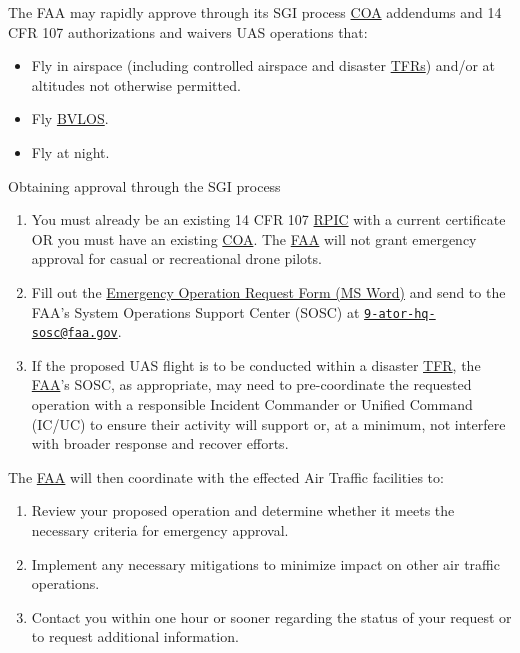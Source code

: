 \documentclass[
]{book}
\providecommand{\tightlist}{%
  \setlength{\itemsep}{0pt}\setlength{\parskip}{0pt}}
\begin{document}
The FAA may rapidly approve through its SGI process \protect\hyperlink{COA}{COA} addendums and 14 CFR 107 authorizations and waivers UAS operations that:

\begin{itemize}
\tightlist
\item
  Fly in airspace (including controlled airspace and disaster \protect\hyperlink{TFR}{TFRs}) and/or at altitudes not otherwise permitted.
\item
  Fly \protect\hyperlink{BVLOS}{BVLOS}.
\item
  Fly at night.
\end{itemize}

Obtaining approval through the SGI process

\begin{enumerate}
\def\labelenumi{\arabic{enumi}.}
\tightlist
\item
  You must already be an existing 14 CFR 107 \protect\hyperlink{RPIC}{RPIC} with a current certificate OR you must have an existing \protect\hyperlink{COA}{COA}. The \protect\hyperlink{FAA}{FAA} will not grant emergency approval for casual or recreational drone pilots.
\item
  Fill out the \href{https://www.faa.gov/uas/getting_started/emergency_approval/media/UAS-SGI_waiver_approval_request_form.docx}{Emergency Operation Request Form (MS Word)} and send to the FAA's System Operations Support Center (SOSC) at \href{mailto:9-ator-hq-sosc@faa.gov}{\nolinkurl{9-ator-hq-sosc@faa.gov}}.
\item
  If the proposed UAS flight is to be conducted within a disaster \protect\hyperlink{TFR}{TFR}, the \protect\hyperlink{FAA}{FAA}'s SOSC, as appropriate, may need to pre-coordinate the requested operation with a responsible Incident Commander or Unified Command (IC/UC) to ensure their activity will support or, at a minimum, not interfere with broader response and recover efforts.
\end{enumerate}

The \protect\hyperlink{FAA}{FAA} will then coordinate with the effected Air Traffic facilities to:

\begin{enumerate}
\def\labelenumi{\arabic{enumi}.}
\tightlist
\item
  Review your proposed operation and determine whether it meets the necessary criteria for emergency approval.
\item
  Implement any necessary mitigations to minimize impact on other air traffic operations.
\item
  Contact you within one hour or sooner regarding the status of your request or to request additional information.
\end{enumerate}
\end{document}
